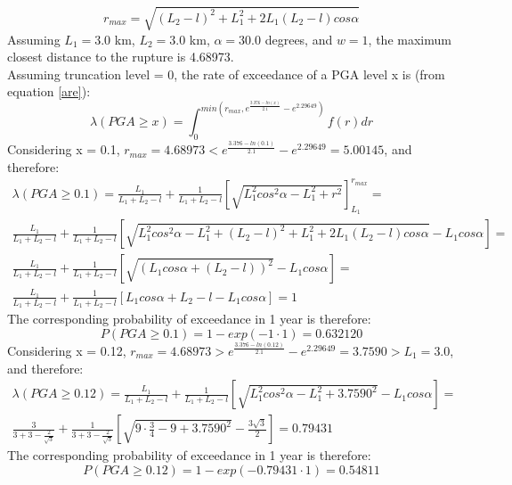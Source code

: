 \begin{equation} 
    r_{max} = \sqrt{(L_{2} - l)^{2} + L_{1}^{2} + 2L_{1}(L_{2} - l)cos\alpha} 
\end{equation} 
Assuming $L_{1}=3.0$ km, $L_{2}=3.0$ km,
$\alpha=30.0$ degrees, and $w=1$, the maximum closest distance to the rupture is
4.68973.\\ Assuming truncation level = 0, the rate of exceedance of a PGA level
x is (from equation \ref{are}): \begin{equation} \lambda(PGA \geq x) =
\int_{0}^{min(r_{max}, e^{\frac{3.376 - ln(x)}{2.1}} - e^{2.29649})} f(r)dr
\end{equation} Considering x = 0.1, $r_{max} = 4.68973 < e^{\frac{3.376 -
ln(0.1)}{2.1}}  - e^{2.29649} = 5.00145$, and therefore: \begin{eqnarray}
    \lambda(PGA \geq 0.1) = \frac{L_{1}}{L_{1}+L_{2}-l} +
    \frac{1}{L_{1}+L_{2}-l}\left[ \sqrt{L_{1}^{2}cos^{2}\alpha-L_{1}^{2}+r^{2}}
    \right]_{L_{1}}^{r_{max}} =\nonumber \\ \frac{L_{1}}{L_{1}+L_{2}-l} +
    \frac{1}{L_{1}+L_{2}-l}\left[ \sqrt{L_{1}^{2}cos^{2}\alpha - L_{1}^{2} +
    (L_{2}-l)^{2} + L_{1}^{2} + 2L_{1}(L_{2} - l)cos\alpha} - L_{1}cos\alpha
\right]=\nonumber \\ \frac{L_{1}}{L_{1}+L_{2}-l} + \frac{1}{L_{1}+L_{2}-l}\left[
\sqrt{(L_{1}cos\alpha + (L_{2}-l))^{2}} - L_{1}cos\alpha \right]=\nonumber \\
\frac{L_{1}}{L_{1}+L_{2}-l} + \frac{1}{L_{1}+L_{2}-l}\left[ L_{1}cos\alpha
+L_{2} - l -L_{1}cos\alpha \right] = 1 \end{eqnarray}
The corresponding probability of exceedance in 1 year is therefore:
\begin{equation}
P(PGA \geq 0.1) = 1 - exp(-1\cdot 1) = 0.632120
\end{equation}
Considering x = 0.12, $r_{max} = 4.68973 > e^{\frac{3.376 - ln(0.12)}{2.1}} - e^{2.29649} = 3.7590 > L_{1} = 3.0$, and therefore:
\begin{eqnarray}
\lambda(PGA \geq 0.12) = \frac{L_{1}}{L_{1}+L_{2}-l} + \frac{1}{L_{1}+L_{2}-l}\left[ \sqrt{L_{1}^{2}cos^{2}\alpha - L_{1}^{2} + 3.7590^{2}}-L_{1}cos\alpha \right]=\nonumber \\
\frac{3}{3+3-\frac{2}{\sqrt{3}}} + \frac{1}{3+3-\frac{2}{\sqrt{3}}}\left[ \sqrt{9\cdot\frac{3}{4} - 9 + 3.7590^{2}} -\frac{3\sqrt{3}}{2}\right] = 0.79431
\end{eqnarray}
The corresponding probability of exceedance in 1 year is therefore:
\begin{equation}
P(PGA\geq0.12) = 1 -exp(-0.79431 \cdot 1) = 0.54811
\end{equation}

